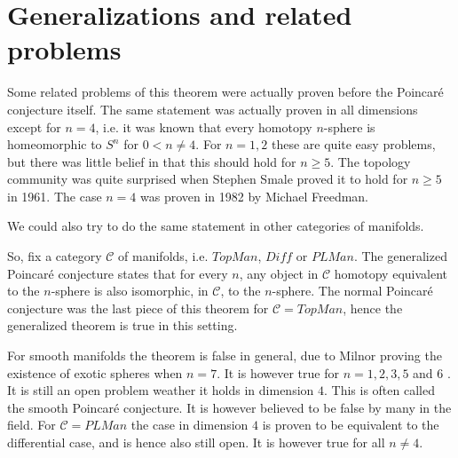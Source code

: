 \section{Generalizations and related problems}

Some related problems of this theorem were actually proven before the Poincaré conjecture itself. 
The same statement was actually proven in all dimensions except for $n=4$, i.e. it was known that every homotopy $n$-sphere is homeomorphic to $S^n$ for $0< n\neq 4$. 
For $n=1, 2$ these are quite easy problems, but there was little belief in that this should hold for $n\geq 5$. 
The topology community was quite surprised when Stephen Smale proved it to hold for $n\geq 5$ in 1961. 
The case $n=4$ was proven in 1982 by Michael Freedman. 

We could also try to do the same statement in other categories of manifolds. 

So, fix a category $\mathcal{C}$  of manifolds, i.e. $TopMan$, $Diff$ or $PLMan$. 
The generalized Poincaré conjecture states that for every $n$, any object in $\mathcal{C}$ homotopy equivalent to the $n$-sphere is also isomorphic, in $\mathcal{C}$, to the $n$-sphere. 
The normal Poincaré conjecture was the last piece of this theorem for $\mathcal{C} = TopMan$, hence the generalized theorem is true in this setting. 

For smooth manifolds the theorem is false in general, due to Milnor proving the existence of exotic spheres when $n=7$. 
It is however true for $n = 1, 2, 3, 5$ and $6$ . 
It is still an open problem weather it holds in dimension $4$. 
This is often called the smooth Poincaré conjecture. 
It is however believed to be false by many in the field. 
For $\mathcal{C} = PLMan$ the case in dimension $4$ is proven to be equivalent to the differential case, and is hence also still open. 
It is however true for all $n\neq 4$.